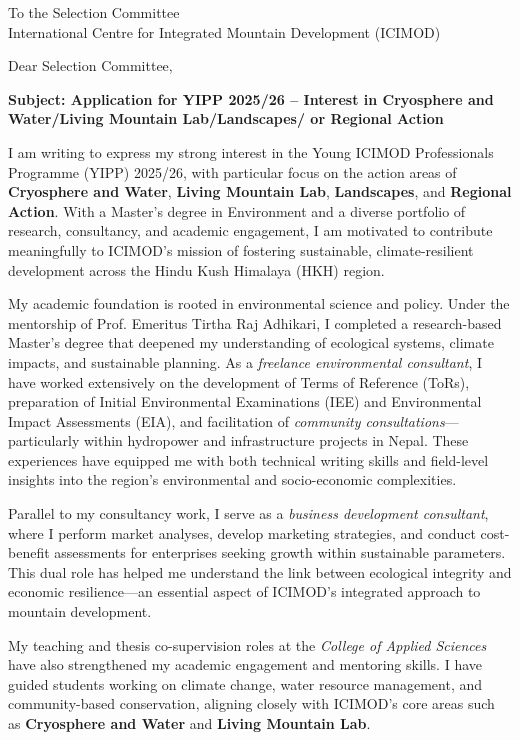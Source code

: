 \documentclass[11pt]{letter}
\begin{document}
\begin{letter}{To the Selection Committee\\
International Centre for Integrated Mountain Development (ICIMOD)\\}

\opening{Dear Selection Committee,}

\onehalfspacing

\textbf{Subject: Application for YIPP 2025/26 – Interest in Cryosphere and Water/Living Mountain Lab/Landscapes/ or Regional Action}

I am writing to express my strong interest in the Young ICIMOD Professionals Programme (YIPP) 2025/26, with particular focus on the action areas of \textbf{Cryosphere and Water}, \textbf{Living Mountain Lab}, \textbf{Landscapes}, and \textbf{Regional Action}. With a Master’s degree in Environment and a diverse portfolio of research, consultancy, and academic engagement, I am motivated to contribute meaningfully to ICIMOD’s mission of fostering sustainable, climate-resilient development across the Hindu Kush Himalaya (HKH) region.

My academic foundation is rooted in environmental science and policy. Under the mentorship of Prof. Emeritus Tirtha Raj Adhikari, I completed a research-based Master’s degree that deepened my understanding of ecological systems, climate impacts, and sustainable planning. As a \textit{freelance environmental consultant}, I have worked extensively on the development of Terms of Reference (ToRs), preparation of Initial Environmental Examinations (IEE) and Environmental Impact Assessments (EIA), and facilitation of \textit{community consultations}—particularly within hydropower and infrastructure projects in Nepal. These experiences have equipped me with both technical writing skills and field-level insights into the region’s environmental and socio-economic complexities.

Parallel to my consultancy work, I serve as a \textit{business development consultant}, where I perform market analyses, develop marketing strategies, and conduct cost-benefit assessments for enterprises seeking growth within sustainable parameters. This dual role has helped me understand the link between ecological integrity and economic resilience—an essential aspect of ICIMOD’s integrated approach to mountain development.

My teaching and thesis co-supervision roles at the \textit{College of Applied Sciences} have also strengthened my academic engagement and mentoring skills. I have guided students working on climate change, water resource management, and community-based conservation, aligning closely with ICIMOD’s core areas such as \textbf{Cryosphere and Water} and \textbf{Living Mountain Lab}.


\end{letter}
\end{document}
